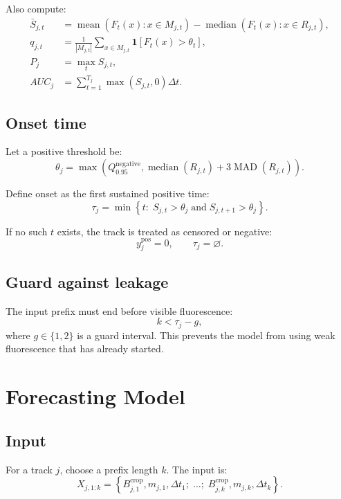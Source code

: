 \documentclass[11pt]{article}
\newcommand{\1}{\mathbf{1}}
\newcommand{\median}{\operatorname{median}}
\newcommand{\MAD}{\operatorname{MAD}}
\begin{document}
Also compute:
\begin{align}
\bar{S}_{j,t} &=
\operatorname{mean}\left(F_t(x):x\in M_{j,t}\right)
-
\median\left(F_t(x):x\in R_{j,t}\right),\\
q_{j,t} &= \frac{1}{|M_{j,t}|}\sum_{x\in M_{j,t}}\1[F_t(x)>\theta_t],\\
P_j &= \max_t S_{j,t},\\
AUC_j &= \sum_{t=1}^{T_j} \max(S_{j,t},0)\Delta t.
\end{align}

\subsection{Onset time}
Let a positive threshold be:
\begin{equation}
\theta_j =
\max\left(
Q_{0.95}^{\mathrm{negative}},
\median(R_{j,t})+3\MAD(R_{j,t})
\right).
\end{equation}

Define onset as the first sustained positive time:
\begin{equation}
\tau_j =
\min\left\{
t:\; S_{j,t}>\theta_j
\;\mathrm{and}\;
S_{j,t+1}>\theta_j
\right\}.
\end{equation}

If no such \(t\) exists, the track is treated as censored or negative:
\begin{equation}
y_j^{\mathrm{pos}}=0,\qquad \tau_j=\varnothing.
\end{equation}

\subsection{Guard against leakage}
The input prefix must end before visible fluorescence:
\begin{equation}
k < \tau_j - g,
\end{equation}
where \(g\in\{1,2\}\) is a guard interval. This prevents the model from using weak fluorescence that has already started.

\section{Forecasting Model}
\subsection{Input}
For a track \(j\), choose a prefix length \(k\). The input is:
\begin{equation}
X_{j,1:k}=
\left\{
B_{j,1}^{\mathrm{crop}},m_{j,1},\Delta t_1;\;
\ldots;\;
B_{j,k}^{\mathrm{crop}},m_{j,k},\Delta t_k
\right\}.
\end{equation}
\end{document}
